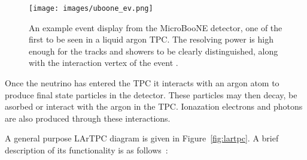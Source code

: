     \begin{figure}[h!]
        \center
        \texttt{[image: images/uboone\_ev.png]}
        \caption{An example event display from the MicroBooNE detector, one of the first to be seen in a liquid argon TPC. The resolving power is high enough for the tracks and showers to be clearly distinguished, along with the interaction vertex of the event \cite{evDisp}.}
        \label{fig:ev_disp}
    \end{figure}

Once the neutrino has entered the TPC it interacts with an argon atom to produce final state particles in the detector. These particles may then decay, be asorbed or interact with the argon in the TPC. Ionazation electrons and photons are also produced through these interactions.

A general purpose LArTPC diagram is given in Figure~\ref{fig:lartpc}. A brief description of its functionality is as follows~\cite{lartpc}: 

\newpage

